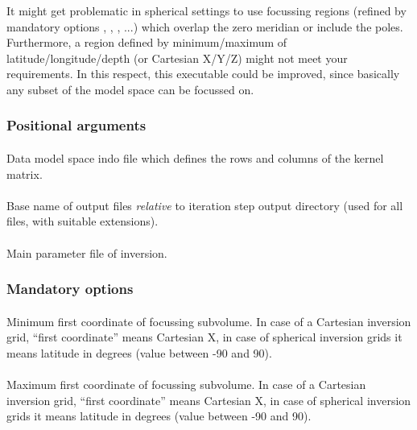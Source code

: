 It might get problematic in spherical settings to use focussing regions (refined by mandatory options 
, , , ...) which overlap the zero meridian or include the poles. 
Furthermore, a region defined by minimum/maximum of latitude/longitude/depth (or Cartesian X/Y/Z) 
might not meet your requirements. In this respect, this executable could be improved, since basically any
subset of the model space can be focussed on.
\subsubsection{Positional arguments}
\paragraph{}
Data model space indo file which defines the rows and columns of the kernel matrix.
\paragraph{}
Base name of output files \emph{relative} to iteration step output directory (used for all files, with 
suitable extensions).
\paragraph{}
Main parameter file of inversion.
\subsubsection{Mandatory options}
\paragraph{}
Minimum first coordinate of focussing subvolume. In case of a Cartesian inversion grid, ``first coordinate''
means Cartesian X, in case of spherical inversion grids it means latitude in degrees (value between -90 and 90).
\paragraph{}
Maximum first coordinate of focussing subvolume. In case of a Cartesian inversion grid, ``first coordinate''
means Cartesian X, in case of spherical inversion grids it means latitude in degrees (value between -90 and 90).
